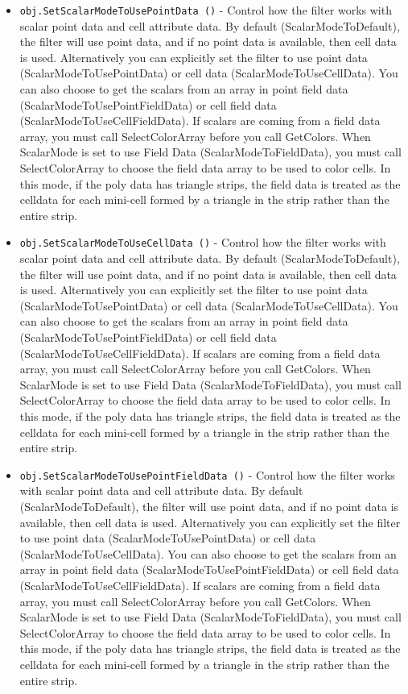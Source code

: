 \begin{itemize}
\item  \verb|obj.SetScalarModeToUsePointData ()| -  Control how the filter works with scalar point data and cell attribute
 data.  By default (ScalarModeToDefault), the filter will use point data,
 and if no point data is available, then cell data is used. Alternatively
 you can explicitly set the filter to use point data
 (ScalarModeToUsePointData) or cell data (ScalarModeToUseCellData).
 You can also choose to get the scalars from an array in point field
 data (ScalarModeToUsePointFieldData) or cell field data
 (ScalarModeToUseCellFieldData).  If scalars are coming from a field
 data array, you must call SelectColorArray before you call
 GetColors.
 When ScalarMode is set to use Field Data (ScalarModeToFieldData), you 
 must call SelectColorArray to choose the field data array to be used to
 color cells. In this mode, if the poly data has triangle strips, 
 the field data is treated as the celldata for each mini-cell formed by
 a triangle in the strip rather than the entire strip.

\item  \verb|obj.SetScalarModeToUseCellData ()| -  Control how the filter works with scalar point data and cell attribute
 data.  By default (ScalarModeToDefault), the filter will use point data,
 and if no point data is available, then cell data is used. Alternatively
 you can explicitly set the filter to use point data
 (ScalarModeToUsePointData) or cell data (ScalarModeToUseCellData).
 You can also choose to get the scalars from an array in point field
 data (ScalarModeToUsePointFieldData) or cell field data
 (ScalarModeToUseCellFieldData).  If scalars are coming from a field
 data array, you must call SelectColorArray before you call
 GetColors.
 When ScalarMode is set to use Field Data (ScalarModeToFieldData), you 
 must call SelectColorArray to choose the field data array to be used to
 color cells. In this mode, if the poly data has triangle strips, 
 the field data is treated as the celldata for each mini-cell formed by
 a triangle in the strip rather than the entire strip.

\item  \verb|obj.SetScalarModeToUsePointFieldData ()| -  Control how the filter works with scalar point data and cell attribute
 data.  By default (ScalarModeToDefault), the filter will use point data,
 and if no point data is available, then cell data is used. Alternatively
 you can explicitly set the filter to use point data
 (ScalarModeToUsePointData) or cell data (ScalarModeToUseCellData).
 You can also choose to get the scalars from an array in point field
 data (ScalarModeToUsePointFieldData) or cell field data
 (ScalarModeToUseCellFieldData).  If scalars are coming from a field
 data array, you must call SelectColorArray before you call
 GetColors.
 When ScalarMode is set to use Field Data (ScalarModeToFieldData), you 
 must call SelectColorArray to choose the field data array to be used to
 color cells. In this mode, if the poly data has triangle strips, 
 the field data is treated as the celldata for each mini-cell formed by
 a triangle in the strip rather than the entire strip.


\end{itemize}
